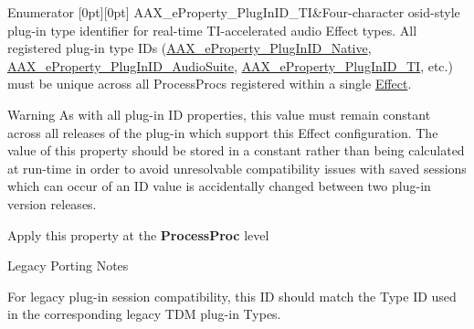 \begin{DoxyEnumFields}{Enumerator}
[0pt][0pt]{}\mbox{\label{a00662_a13e384f22825afd3db6d68395b79ce0da75f174df4efbeca86eaada126c1d9214}} 
A\+A\+X\+\_\+e\+Property\+\_\+\+Plug\+In\+I\+D\+\_\+\+TI&Four-\/character osid-\/style plug-\/in type identifier for real-\/time T\+I-\/accelerated audio Effect types. All registered plug-\/in type I\+Ds (\mbox{\hyperlink{a00662_a13e384f22825afd3db6d68395b79ce0da89ca3dd6e96895cda14976c1b1ceb826}{A\+A\+X\+\_\+e\+Property\+\_\+\+Plug\+In\+I\+D\+\_\+\+Native}}, \mbox{\hyperlink{a00662_a13e384f22825afd3db6d68395b79ce0dad3344696b8298a8b254add3d039ea927}{A\+A\+X\+\_\+e\+Property\+\_\+\+Plug\+In\+I\+D\+\_\+\+Audio\+Suite}}, \mbox{\hyperlink{a00662_a13e384f22825afd3db6d68395b79ce0da75f174df4efbeca86eaada126c1d9214}{A\+A\+X\+\_\+e\+Property\+\_\+\+Plug\+In\+I\+D\+\_\+\+TI}}, etc.) must be unique across all Process\+Procs registered within a single \mbox{\hyperlink{a01813}{Effect}}.

\begin{DoxyWarning}{Warning}
As with all plug-\/in ID properties, this value must remain constant across all releases of the plug-\/in which support this Effect configuration. The value of this property should be stored in a constant rather than being calculated at run-\/time in order to avoid unresolvable compatibility issues with saved sessions which can occur of an ID value is accidentally changed between two plug-\/in version releases.
\end{DoxyWarning}
\begin{DoxyItemize}
\item Apply this property at the {\bfseries{Process\+Proc}} level\end{DoxyItemize}
\begin{DoxyRefDesc}{Legacy Porting Notes}
\item[\mbox{\hyperlink{a00787__porting_notes000045}{Legacy Porting Notes}}]For legacy plug-\/in session compatibility, this ID should match the Type ID used in the corresponding legacy T\+DM plug-\/in Types. \end{DoxyRefDesc}
\\
\hline


\end{DoxyEnumFields}
